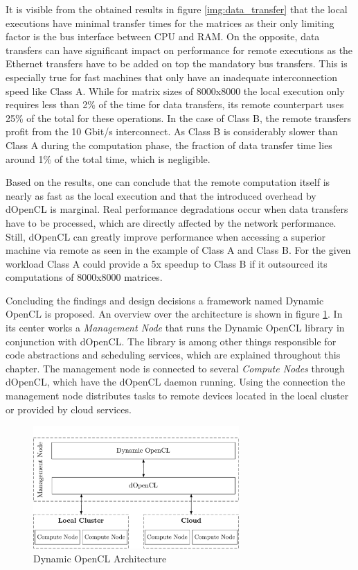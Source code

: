It is visible from the obtained results in figure \ref{img:data_transfer} that the local executions have minimal transfer times for the matrices as their only limiting factor is the bus interface between CPU and RAM. On the opposite, data transfers can have significant impact on performance for remote executions as the Ethernet transfers have to be added on top the mandatory bus transfers. This is especially true for fast machines that only have an inadequate interconnection speed like Class A. While for matrix sizes of 8000x8000 the local execution only requires less than 2\% of the time for data transfers, its remote counterpart uses 25\% of the total for these operations. In the case of Class B, the remote transfers profit from the 10 Gbit/s interconnect. As Class B is considerably slower than Class A during the computation phase, the fraction of data transfer time lies around 1\% of the total time, which is negligible.

Based on the results, one can conclude that the remote computation itself is nearly as fast as the local execution and that the introduced overhead by dOpenCL is marginal. Real performance degradations occur when data transfers have to be processed, which are directly affected by the network performance. Still, dOpenCL can greatly improve performance when accessing a superior machine via remote as seen in the example of Class A and Class B. For the given workload Class A could provide a 5x speedup to Class B if it outsourced its computations of 8000x8000 matrices.

Concluding the findings and design decisions a framework named Dynamic OpenCL is proposed. An overview over the architecture is shown in figure \ref{img:dynamic_opencl_arch}. In its center works a \textit{Management Node} that runs the Dynamic OpenCL library in conjunction with dOpenCL. The library is among other things responsible for code abstractions and scheduling services, which are explained throughout this chapter. The management node is connected to several \textit{Compute Nodes} through dOpenCL, which have the dOpenCL daemon running. Using the connection the management node distributes tasks to remote devices located in the local cluster or provided by cloud services.

\begin{figure}[H]

	\includegraphics[width=0.7\textwidth]{drawings/dynamic_opencl_arch.pdf}
	\centering
	\caption{Dynamic OpenCL Architecture}
	\label{img:dynamic_opencl_arch}
\end{figure}

